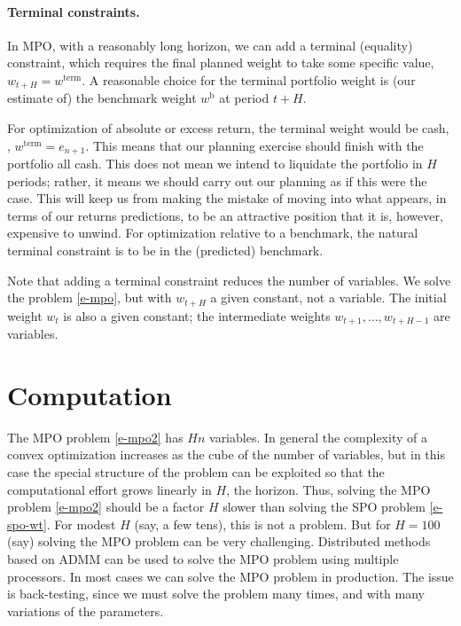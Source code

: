 \documentclass[openany]{article}  %
\newcommand{\wb}{w^\mathrm{b}}
\begin{document}
\paragraph{Terminal constraints.}
In MPO, with a reasonably long horizon, we can add a terminal (equality) constraint,
which requires the final planned weight to take some specific value,
$w_{t+H}=w^\mathrm{term}$.
A reasonable choice for the terminal portfolio weight is (our estimate of)
the benchmark weight $\wb$ at period $t+H$.

For optimization of absolute or excess return, the terminal
weight would be cash, \ie, $w^\mathrm{term} = e_{n+1}$.
This means that our planning exercise should finish with the portfolio
all cash.  This does not mean we intend to liquidate the portfolio
in $H$ periods; rather, it means we should carry out our planning
as if this were the case.   This will keep us from making the mistake
of moving into what appears, in terms of our returns predictions, to be
an attractive position that it is, however, expensive to unwind.
For optimization relative to a benchmark, the natural terminal constraint
is to be in the (predicted) benchmark.

Note that adding a terminal constraint reduces the number of variables.
We solve the problem \eqref{e-mpo}, but with $w_{t+H}$ a given constant,
not a variable.
The initial weight $w_t$ is also a given constant;
the intermediate weights $w_{t+1}, \ldots, w_{t+H-1}$ are variables.


\section{Computation}\label{s-mpo-computation}
The MPO problem \eqref{e-mpo2} has $Hn$ variables.  In general the complexity
of a convex optimization increases as the cube of the number of variables,
but in this case the special structure of the problem can be exploited
so that the computational effort grows linearly in $H$, the horizon.
Thus, solving the MPO problem \eqref{e-mpo2} should be a factor $H$ slower than
solving the SPO problem \eqref{e-spo-wt}.
For modest $H$ (say, a few tens), this is not a problem.
But for $H=100$ (say) solving the MPO problem can be very challenging.
Distributed methods based on ADMM \cite{boyd2011distributed,boyd2014performance} can be used
to solve the MPO problem using multiple processors.
In most cases we can solve the MPO problem in production.
The issue is back-testing, since we must solve the problem many times,
and with many variations of the parameters.
\end{document}
